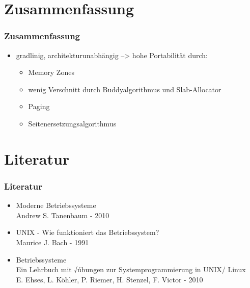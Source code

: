 \documentclass[ddcfooter,nosectionnum]{tudbeamer}
\begin{document}
\section{Zusammenfassung}
\begin{frame}
    \frametitle{Zusammenfassung}
    \begin{itemize}
    	\item gradlinig, architekturunabhängig --> hohe Portabilität durch:
		\begin{itemize}
			\item Memory Zones
			\item wenig Verschnitt durch Buddyalgorithmus und Slab-Allocator 			\item Paging
			\item Seitenersetzungsalgorithmus
		\end{itemize}
	 \end{itemize}
    
\end{frame}


\section{Literatur}
\begin{frame}
    \frametitle{Literatur}
    \begin{itemize}
         \item  Moderne Betriebssysteme \\
        		Andrew S. Tanenbaum - 2010
	\item	 UNIX - Wie funktioniert das Betriebssystem? \\
		Maurice J. Bach - 1991
	\item Betriebssysteme\\
		Ein Lehrbuch mit √úbungen zur Systemprogrammierung in UNIX/ Linux \\
		E. Ehses, L. Köhler, P. Riemer, H. Stenzel, F. Victor - 2010	
    \end{itemize}
    
\end{frame}
\end{document}
